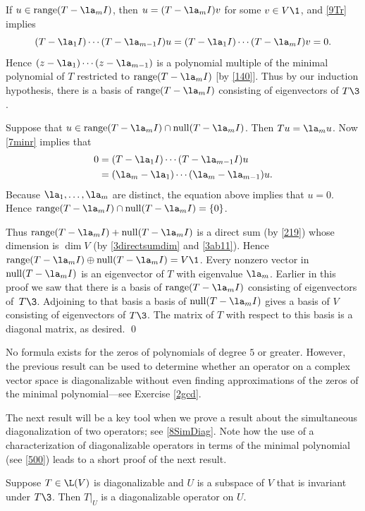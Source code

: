 If $u \in \ran(T-\la_m I)$, then $u = (T - \la_m I) v$ for some $v \in V\1$, and \ref{9Tr} implies
\begin{equation} \label{7minr}
(T - \la_1 I) \cdots (T - \la_{m-1} I) u = (T - \la_1 I) \cdots (T - \la_m I) v = 0.
\end{equation}%
Hence $(z - \la_1) \cdots (z-\la_{m-1})$ is a polynomial multiple of the minimal polynomial of $T$ restricted to $\ran(T - \la_m I)$ [by \ref{140}].
Thus by our induction hypothesis, there is a basis of $\ran(T - \la_m I)$ consisting of eigenvectors of $T\3$.

Suppose that $u \in \ran(T - \la_m I) \cap \ker(T - \la_m I)$. Then $Tu = \la_m u$. Now \ref{7minr} implies that
\begin{align*}
0 &= (T - \la_1 I) \cdots (T - \la_{m-1} I)u \\
&= (\la_m - \la_1) \cdots (\la_m - \la_{m-1}) u.
\end{align*}
Because $\la_1, \ldots, \la_m$ are distinct, the equation above implies that $u = 0$. Hence $\ran(T - \la_m I) \cap \ker(T - \la_m I) = \br{0}$.

Thus $\ran(T - \la_m I) + \ker(T - \la_m I)$ is a direct sum (by \ref{219}) whose dimension is $\dim V$ (by \ref{3directsumdim} and \ref{3ab11}). Hence $\ran(T - \la_m I) \oplus \ker(T - \la_m I) = V\1$. Every nonzero vector in $\ker(T-\la_m I)$ is an eigenvector of $T$ with eigenvalue $\la_m$. Earlier in this proof we saw that there is a basis of $\ran(T - \la_m I)$ consisting of eigenvectors of~$T\3$. Adjoining to that basis a basis of $\ker(T - \la_m I)$ gives a basis of $V$ consisting of eigenvectors of $T\3$. The matrix of $T$ with respect to this basis is a diagonal matrix, as desired.
\qed

No formula exists for the zeros of polynomials of degree $5$ or greater. However, the previous result can be used to determine whether an operator on a complex vector space is diagonalizable without even finding approximations of the zeros of the minimal polynomial---see Exercise \ref{2gcd}.

The next result will be a key tool when we prove a result about the simultaneous diagonalization of two operators; see \ref{8SimDiag}. Note how the use of a characterization of diagonalizable operators in terms of the minimal polynomial (see \ref{500}) leads to a short proof of the next result.

{Suppose $T \in \L(V)$ is diagonalizable and $U$ is a subspace of $V$ that is invariant under $T\3$. Then $T|_U$ is a diagonalizable operator on $U$.}

